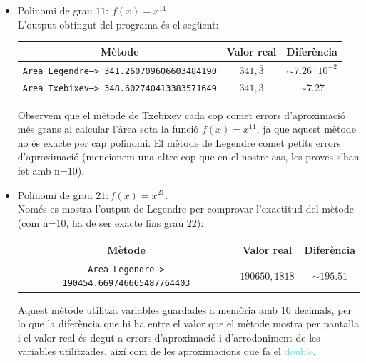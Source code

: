 \documentclass[12pt]{article}
\begin{document}
\begin{itemize}
    \item Polinomi de grau $11$: $f(x) = x^{11}$.\\
    L'output obtingut del programa és el següent:
          \begin{table}[h]
            \begin{center}
            \begin{tabular}{ c | c | c }
            \textbf{Mètode} & \textbf{Valor real}  & \textbf{Diferència}\\ \hline
            \texttt{Area Legendre--> 341.260709606603484190} & $341,\bar{3}$ & $\sim7.26\cdot 10^{-2}$\\ 
            \texttt{Area Txebixev--> 348.602740413383571649} & $341,\bar{3}$ & $\sim7.27$\\ 
            \end{tabular}
            \end{center}
        \end{table}
        
        Observem que el mètode de Txebixev cada cop comet errors d'aproximació més grans al calcular l'àrea sota la funció $f(x)=x^{11}$, ja que aquest mètode no és exacte per cap polinomi. El mètode de Legendre comet petits errors d'aproximació (mencionem una altre cop que en el nostre cas, les proves s'han fet amb n=10).
        
     \item Polinomi de grau $21: f(x) = x^{21}$.\\
    Només es mostra l'output de Legendre per comprovar l'exactitud del mètode (com n=10, ha de ser exacte fins grau 22):
    
   \begin{table}[h]
            \begin{center}
            \begin{tabular}{ c | c | c }
            \textbf{Mètode} & \textbf{Valor real}  & \textbf{Diferència}\\ \hline
            \texttt{Area Legendre--> 190454.669746665487764403} & $190650,1818$ & $\sim195.51$\\ 
            \end{tabular}
            \end{center}
        \end{table}  
    
      
     Aquest mètode utilitza variables guardades a memòria amb 10 decimals, per lo que la diferència que hi ha entre el valor que el mètode mostra per pantalla i el valor real és degut a errors d'aproximació i d'arrodoniment de les variables utilitzades, així com de les aproximacions que fa el \textcolor{Turquoise}{double}.
         

\end{itemize}
\end{document}
